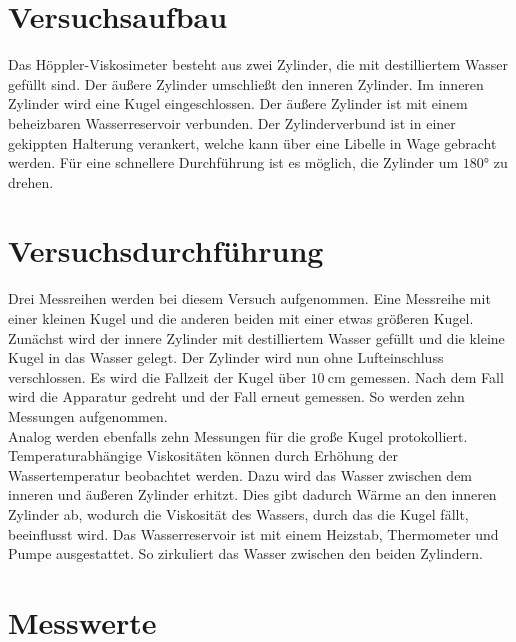 


\section{Versuchsaufbau}
Das Höppler-Viskosimeter besteht aus zwei Zylinder, die mit destilliertem Wasser gefüllt sind. 
Der äußere Zylinder umschließt den inneren Zylinder. Im inneren Zylinder wird eine Kugel 
eingeschlossen. Der äußere Zylinder ist mit einem beheizbaren Wasserreservoir verbunden. 
Der Zylinderverbund ist in einer gekippten Halterung verankert, welche kann über eine Libelle 
in Wage gebracht werden. Für eine schnellere Durchführung ist es möglich, die Zylinder um 
$\ang{180;;}$ zu drehen.


\section{Versuchsdurchführung}
Drei Messreihen werden bei diesem Versuch aufgenommen. Eine Messreihe mit einer kleinen Kugel 
und die anderen beiden mit einer etwas größeren Kugel. Zunächst wird der innere Zylinder mit  
destilliertem Wasser gefüllt und die kleine Kugel in das Wasser gelegt. Der Zylinder wird nun 
ohne Lufteinschluss verschlossen. Es wird die Fallzeit der Kugel über $\qty{10}{\centi \meter}$
gemessen. Nach dem Fall wird die Apparatur gedreht und der Fall erneut gemessen. So werden zehn 
Messungen aufgenommen.\\
\noindent Analog werden ebenfalls zehn Messungen für die große Kugel protokolliert. \\
\noindent Temperaturabhängige Viskositäten können durch Erhöhung der Wassertemperatur beobachtet werden. 
Dazu wird das Wasser zwischen dem inneren und äußeren Zylinder erhitzt. Dies gibt dadurch Wärme 
an den inneren Zylinder ab, wodurch die Viskosität des Wassers, durch das die Kugel fällt, beeinflusst wird.
Das Wasserreservoir ist mit einem Heizstab, Thermometer und Pumpe ausgestattet. So zirkuliert das Wasser 
zwischen den beiden Zylindern. 




\section{Messwerte}




